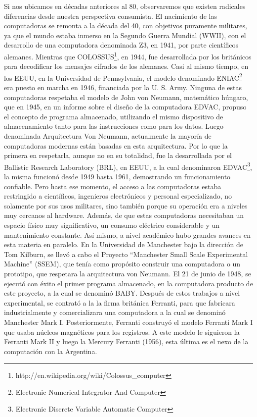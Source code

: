 \documentclass[%
 	final,
%
	notitlepage,
	narroweqnarray,
	inline,
 	twoside,
	]{ieee}
\newcommand{\link}[1]{\textit{}{#1}}
\begin{document}
Si nos ubicamos en d\'ecadas anteriores al 80, observaremos que existen radicales diferencias desde nuestra perspectiva consumista.
El nacimiento de las computadoras se remonta a la d\'ecada del 40, con objetivos puramente militares, ya que el mundo estaba inmerso en la Segundo Guerra Mundial (WWII), con el desarrollo de una computadora denominada Z3\cite{z3}, en 1941, por parte cient\'ificos alemanes. Mientras que COLOSSUS\footnote{\link{http://en.wikipedia.org/wiki/Colossus\_computer}}, en 1944, fue desarrollada por los brit\'anicos para decodificar los mensajes cifrados de los alemanes. Casi al mismo tiempo, en los EEUU, en la Universidad de Pennsylvania, el modelo denominado ENIAC\footnote{Electronic Numerical Integrator And Computer\cite{eniac}} era puesto en marcha en 1946, financiada por la U. S. Army.
Ninguna de estas computadoras respetaba el modelo de John von Neumann, matem\'atico h\'ungaro, que en 1945, en un informe sobre el dise\~no de la computadora EDVAC, propuso el concepto de programa almacenado, utilizando el mismo dispositivo de almacenamiento tanto para las instrucciones como para los datos. Luego denominada Arquitectura Von Neumann\cite{newman}, actualmente la mayor\'ia de computadoras modernas est\'an basadas en esta arquitectura.
Por lo que la primera en respetarla, aunque no en su totalidad, fue la desarrollada por el Ballistic Research Laboratory (BRL), en EEUU, a la cual denominaron EDVAC\footnote{Electronic Discrete Variable Automatic Computer\cite{edvac}}, la misma funcion\'o desde 1949 hasta 1961, demostrando un funcionamiento confiable.
Pero hasta ese momento, el acceso a las computadoras estaba restringido a cient\'ificos, ingenieros electr\'onicos y personal especializado, no solamente por sus usos militares, sino tambi\'en porque su operaci\'on era a niveles muy cercanos al hardware. Adem\'as, de que estas computadoras necesitaban un espacio f\'isico muy significativo, un consumo el\'ectrico considerable y un mantenimiento constante.
As\'i mismo, a nivel acad\'emico hubo grandes avances en esta materia en paralelo. En la Universidad de Manchester bajo la direcci\'on de Tom Kilburn, se llev\'o a cabo el Proyecto “Manchester Small Scale Experimental Machine” (SSEM), que ten\'ia como prop\'osito construir una computadora o un prototipo, que respetara la arquitectura von Neumann. El 21 de junio de 1948, se ejecut\'o con \'exito el primer programa almacenado, en la computadora producto de este proyecto, a la cual se denomin\'o BABY.
Despu\'es de estos trabajos a nivel experimental, se contrat\'o a la la firma brit\'anica Ferranti\cite{ferranti}, para que fabricara industrialmente y comercializara una computadora a la cual se denomin\'o Manchester Mark I\cite{mark1}.
Posteriormente, Ferranti construy\'o el modelo Ferranti Mark I que usaba n\'ucleos magn\'eticos para los registros. A este modelo le siguieron la Ferranti Mark II y luego la Mercury Ferranti (1956), esta \'ultima es el nexo de la computaci\'on con la Argentina.
\end{document}
